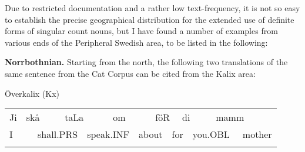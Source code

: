 \begin{styleBodyTextFirst}
Due to restricted documentation and a rather low text-frequency, it is not so easy to establish the precise geographical distribution for the extended use of definite forms of singular count nouns, but I have found a number of examples from various ends of the Peripheral Swedish area, to be listed in the following: 

\end{styleBodyTextFirst}

\begin{styleBodytextC}
\textbf{Norrbothnian.} Starting from the north, the following two translations of the same sentence from the Cat Corpus can be cited from the Kalix area:

\end{styleBodytextC}

\begin{listWWNumileveli}
\item {}

\end{listWWNumileveli}

\begin{listWWNumxlivleveli}
\item {}

\begin{styleExLtrTbl}
Överkalix (Kx)

\end{styleExLtrTbl}

\end{listWWNumxlivleveli}

\begin{tabular}{llllllllllllll}
\lsptoprule
Ji & \multicolumn{2}{l}{skå

} & \multicolumn{2}{l}{taLa

} & \multicolumn{2}{l}{om

} & \multicolumn{2}{l}{föR

} & \multicolumn{2}{l}{di

} & \multicolumn{2}{l}{mamm

} & \\
\multicolumn{2}{l}{I

} & \multicolumn{2}{l}{shall.PRS

} & \multicolumn{2}{l}{speak.INF

} & \multicolumn{2}{l}{about

} & \multicolumn{2}{l}{for

} & \multicolumn{2}{l}{you.OBL

} & \multicolumn{2}{l}{mother

}\\
\lspbottomrule
\end{tabular}

